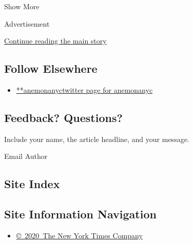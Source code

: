 Show More

Advertisement

\protect\hyperlink{after-mid2}{Continue reading the main story}

\hypertarget{follow-elsewhere}{%
\subsection{Follow Elsewhere}\label{follow-elsewhere}}

\begin{itemize}
\tightlist
\item
  \href{https://twitter.com/anemonanyc}{**anemonanyctwitter page for
  anemonanyc}
\end{itemize}

\hypertarget{feedback-questions}{%
\subsection{Feedback? Questions?}\label{feedback-questions}}

Include your name, the article headline, and your message.

Email Author

\hypertarget{site-index}{%
\subsection{Site Index}\label{site-index}}

\hypertarget{site-information-navigation}{%
\subsection{Site Information
Navigation}\label{site-information-navigation}}

\begin{itemize}
\tightlist
\item
  \href{https://help.nytimes.com/hc/en-us/articles/115014792127-Copyright-notice}{©~2020~The
  New York Times Company}
\end{itemize}

